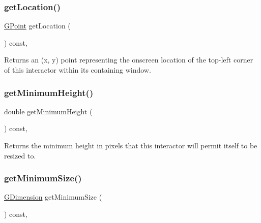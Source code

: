 \mbox{\label{classsgl_1_1GInteractor_a4f83802015511edeb63b892830812c11}} 
\subsubsection{\texorpdfstring{get\+Location()}{getLocation()}}
{\footnotesize\ttfamily \mbox{\hyperlink{structsgl_1_1GPoint}{G\+Point}} get\+Location (\begin{DoxyParamCaption}{ }\end{DoxyParamCaption}) const\hspace{0.3cm}{\ttfamily [virtual]}, {\ttfamily [inherited]}}



Returns an (x, y) point representing the onscreen location of the top-\/left corner of this interactor within its containing window. 

\mbox{\label{classsgl_1_1GInteractor_aed4b0075fcc434499c3cb3e46896bda3}} 
\subsubsection{\texorpdfstring{get\+Minimum\+Height()}{getMinimumHeight()}}
{\footnotesize\ttfamily double get\+Minimum\+Height (\begin{DoxyParamCaption}{ }\end{DoxyParamCaption}) const\hspace{0.3cm}{\ttfamily [virtual]}, {\ttfamily [inherited]}}



Returns the minimum height in pixels that this interactor will permit itself to be resized to. 

\mbox{\label{classsgl_1_1GInteractor_a66b5af0b32493b4d597ca0a3df2049ea}} 
\subsubsection{\texorpdfstring{get\+Minimum\+Size()}{getMinimumSize()}}
{\footnotesize\ttfamily \mbox{\hyperlink{structsgl_1_1GDimension}{G\+Dimension}} get\+Minimum\+Size (\begin{DoxyParamCaption}{ }\end{DoxyParamCaption}) const\hspace{0.3cm}{\ttfamily [virtual]}, {\ttfamily [inherited]}}



